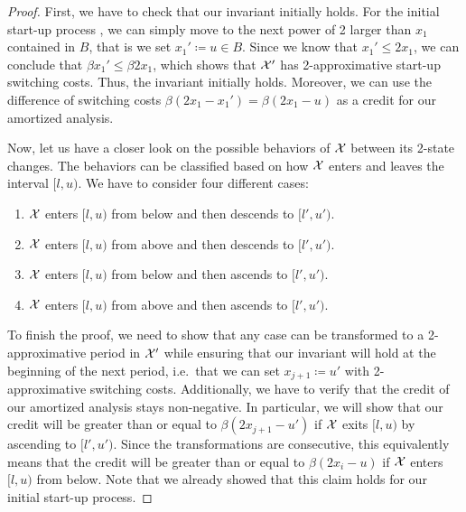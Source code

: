 \begin{proof}
First, we have to check that our invariant initially holds. For the initial start-up process , we can simply move to the next power of 2 larger than $x_1$ contained in $B$, that is we set $x_1'\coloneqq u\in B$. Since we know that $x_1'\le2x_1$, we can conclude that $\beta x_1'\le\beta 2x_1$, which shows that $\mathcal{X}'$ has 2-approximative start-up switching costs. Thus, the invariant initially holds. Moreover, we can use the difference of switching costs $\beta(2x_1-x_1')=\beta(2x_1-u)$ as a credit for our amortized analysis.

Now, let us have a closer look on the possible behaviors of $\mathcal{X}$ between its 2-state changes. The behaviors can be classified based on how $\mathcal{X}$ enters and leaves the interval $[l,u)$. We have to consider four different cases:
\begin{enumerate}[label=(\alph*)]
	\item $\mathcal{X}$ enters $[l,u)$ from below and then descends to $[l',u')$.\label{itm:schedule_behavior_up_down}
	\item $\mathcal{X}$ enters $[l,u)$ from above and then descends to $[l',u')$.\label{itm:schedule_behavior_down_down}
	\item $\mathcal{X}$ enters $[l,u)$ from below and then ascends to $[l',u')$.\label{itm:schedule_behavior_up_up} 
	\item $\mathcal{X}$ enters $[l,u)$ from above and then ascends to $[l',u')$.\label{itm:schedule_behavior_down_up} 
\end{enumerate}
To finish the proof, we need to show that any case can be transformed to a 2-approximative period in $\mathcal{X}'$ while ensuring that our invariant will hold at the beginning of the next period, i.e.\ that we can set $x_{j+1}\coloneqq u'$ with 2-approximative switching costs. Additionally, we have to verify that the credit of our amortized analysis stays non-negative. In particular, we will show that our credit will be greater than or equal to $\beta(2x_{j+1}-u')$ if $\mathcal{X}$ exits $[l,u)$ by ascending to $[l',u')$. Since the transformations are consecutive, this equivalently means that the credit will be greater than or equal to $\beta(2x_i-u)$ if $\mathcal{X}$ enters $[l,u)$ from below. Note that we already showed that this claim holds for our initial start-up process.
	

\end{proof}
